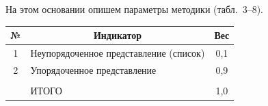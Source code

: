   На этом основании опишем параметры методики (табл.~3--8).





\begin{table}[b]\small %


\vspace*{-12pt}


\begin{center}


\parbox{238pt}{


}





\vspace*{2ex}





\begin{tabular}{|c|l|c|}


\hline


№&\multicolumn{1}{c|}{Индикатор}&Вес\\


\hline


1&Неупорядоченное представление (список)&0,1\\


2&Упорядоченное представление&0,9\\


\hline


&&\\[-10pt]


&ИТОГО&1,0\\


\hline


\end{tabular}


\end{center}


\vspace*{-12pt}






\begin{center}


\parbox{238pt}{


}






\end{center}
\end{table}
